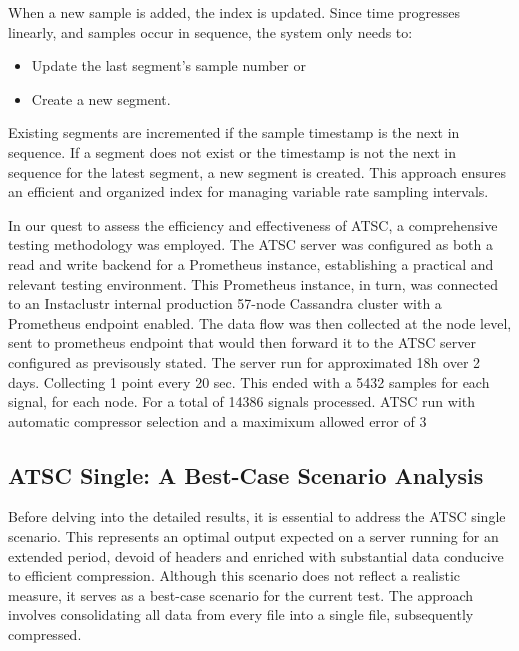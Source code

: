 \documentclass[conference]{IEEEtran}
\begin{document}
When a new sample is added, the index is updated. Since time progresses linearly, and samples occur in sequence, the system only needs to:
\begin{itemize}
    \item Update the last segment's sample number or
    \item Create a new segment.
\end{itemize}

Existing segments are incremented if the sample timestamp is the next in sequence. If a segment does not exist or the timestamp is not the next in sequence for the latest segment, a new segment is created. This approach ensures an efficient and organized index for managing variable rate sampling intervals.


In our quest to assess the efficiency and effectiveness of ATSC, a comprehensive testing methodology was employed. The ATSC server was configured as both a read and write backend for a Prometheus instance, establishing a practical and relevant testing environment. This Prometheus instance, in turn, was connected to an Instaclustr internal production 57-node Cassandra cluster with a Prometheus endpoint enabled. 
The data flow was then collected at the node level, sent to prometheus endpoint that would then forward it to the ATSC server configured as previsously stated.
The server run for approximated 18h over 2 days. Collecting 1 point every 20 sec. This ended with a 5432 samples for each signal, for each node. For a total of 14386 signals processed.
ATSC run with automatic compressor selection and a maximixum allowed error of 3\\%

\subsection*{ATSC Single: A Best-Case Scenario Analysis}

Before delving into the detailed results, it is essential to address the ATSC single scenario. This represents an optimal output expected on a server running for an extended period, devoid of headers and enriched with substantial data conducive to efficient compression. Although this scenario does not reflect a realistic measure, it serves as a best-case scenario for the current test. The approach involves consolidating all data from every file into a single file, subsequently compressed.
\end{document}
